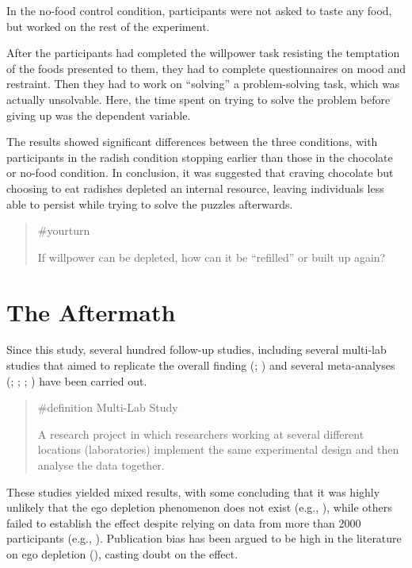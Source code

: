 \documentclass[
  letterpaper,
]{book}
\begin{document}
In the no-food control condition, participants were not asked to taste
any food, but worked on the rest of the experiment.

After the participants had completed the willpower task resisting the
temptation of the foods presented to them, they had to complete
questionnaires on mood and restraint. Then they had to work on
``solving'' a problem-solving task, which was actually unsolvable. Here,
the time spent on trying to solve the problem before giving up was the
dependent variable.

The results showed significant differences between the three conditions,
with participants in the radish condition stopping earlier than those in
the chocolate or no-food condition. In conclusion, it was suggested that
craving chocolate but choosing to eat radishes depleted an internal
resource, leaving individuals less able to persist while trying to solve
the puzzles afterwards.

\begin{quote}
{\#yourturn}

If willpower can be depleted, how can it be ``refilled'' or built up
again?
\end{quote}

\section{The Aftermath}\label{the-aftermath}

Since this study, several hundred follow-up studies, including several
multi-lab studies that aimed to replicate the overall finding
(;
) and several meta-analyses
(;
;
;
) have
been carried out.

\begin{quote}
\label{def-multilabstudy}{\#definition} Multi-Lab Study

A research project in which researchers working at several different
locations (laboratories) implement the same experimental design and then
analyse the data together.
\end{quote}

These studies yielded mixed results, with some concluding that it was
highly unlikely that the ego depletion phenomenon does not exist (e.g.,
), while others failed to
establish the effect despite relying on data from more than 2000
participants (e.g., ).
Publication bias has been argued to be high in the literature on ego
depletion (), casting doubt on the effect.
\end{document}

